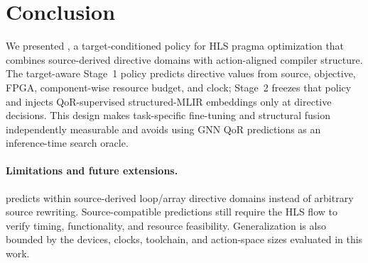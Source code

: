 \section{Conclusion}

We presented \framework, a target-conditioned policy for HLS pragma optimization that combines source-derived directive domains with action-aligned compiler structure. The target-aware Stage~1 policy predicts directive values from source, objective, FPGA, component-wise resource budget, and clock; Stage~2 freezes that policy and injects QoR-supervised structured-MLIR embeddings only at directive decisions. This design makes task-specific fine-tuning and structural fusion independently measurable and avoids using GNN QoR predictions as an inference-time search oracle.


\paragraph{Limitations and future extensions.}
\framework predicts within source-derived loop/array directive domains instead of arbitrary source rewriting. Source-compatible predictions still require the HLS flow to verify timing, functionality, and resource feasibility. Generalization is also bounded by the devices, clocks, toolchain, and action-space sizes evaluated in this work. 
